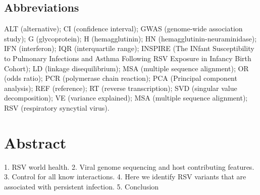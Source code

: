 \documentclass{article}
\begin{document}
\linenumbers
\subsection*{Abbreviations}
ALT (alternative);
CI (confidence interval);
GWAS (genome-wide association study);
G (glycoprotein);
H (hemagglutinin);
HN (hemagglutinin-neuraminidase);
IFN (interferon);
IQR (interquartile range);
INSPIRE (The INfant Susceptibility to Pulmonary Infections and Asthma Following RSV Exposure in Infancy Birth Cohort);
LD (linkage disequilibrium);
MSA (multiple sequence alignment);
OR (odds ratio);
PCR (polymerase chain reaction);
PCA (Principal component analysis);
REF  (reference);
RT (reverse transcription);
SVD (singular value decomposition);
VE (variance explained);
MSA (multiple sequence alignment);
RSV (respiratory syncytial virus).

\section{Abstract}
1. RSV world health.
2. Viral genome sequencing and host contributing features.
3. Control for all know interactions.
4. Here we identify RSV variants that are associated with persistent infection.
5. Conclusion
\end{document}
